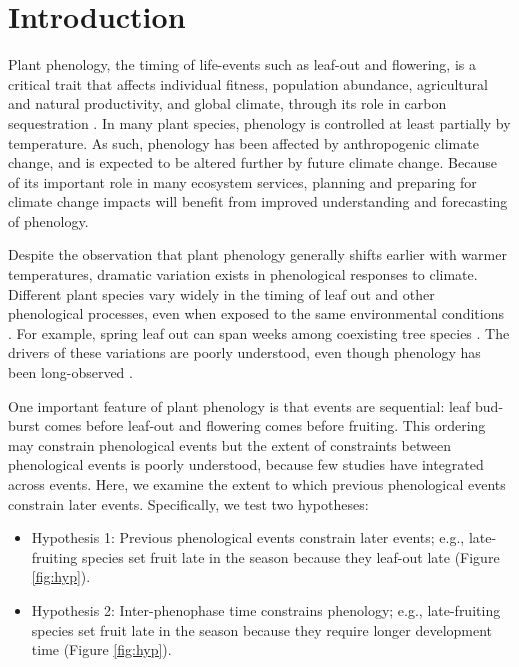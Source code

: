 \documentclass{article}
\begin{document}
\section* {Introduction}
Plant phenology, the timing of life-events such as leaf-out and flowering, is a critical trait that affects individual fitness, population abundance, agricultural and natural productivity, and global climate, through its role in carbon sequestration \citep{miller-rushing2008,primack2009a,willis2010,miller-rushing2010}. In many plant species, phenology is controlled at least partially by temperature. As such, phenology has been affected by anthropogenic climate change, and is expected to be altered further by future climate change\citep{parmesan2006}. Because of its important role in many ecosystem services, planning and preparing for climate change impacts will benefit from improved understanding and forecasting of phenology.
\par Despite the observation that plant phenology generally shifts earlier with warmer temperatures, dramatic variation exists in phenological responses to climate. Different plant species vary widely in the timing of leaf out and other phenological processes, even when exposed to the same environmental conditions \citep{lechowicz1984,primack2009c}. For example, spring leaf out can span weeks among coexisting tree species \citep{lechowicz1984}. The drivers of these variations are poorly understood, even though phenology has been long-observed \citep{wolkovich2014}.
\par One important feature of plant phenology is that events are sequential: leaf bud-burst comes before leaf-out and flowering comes before fruiting. This ordering may constrain phenological events but the extent of constraints between phenological events is poorly understood, because few studies have integrated across events. Here, we examine the extent to which previous phenological events constrain later events. Specifically, we test two hypotheses:
\begin{itemize}
\item Hypothesis 1: Previous phenological events constrain later events; e.g., late-fruiting species set fruit late in the season because they leaf-out late  (Figure \ref{fig:hyp}).
\item Hypothesis 2: Inter-phenophase time  constrains phenology; e.g., late-fruiting species set fruit late in the season because they require longer development time (Figure \ref{fig:hyp}).
\end{itemize}
\end{document}
